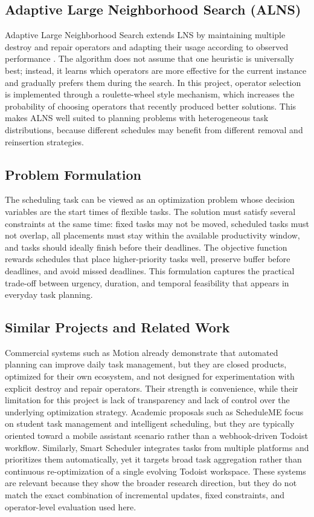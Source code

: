 \documentclass{article}
\begin{document}
\subsection{Adaptive Large Neighborhood Search (ALNS)}
Adaptive Large Neighborhood Search extends LNS by maintaining multiple destroy and repair operators and adapting their usage according to observed performance \cite{ropke2006}. The algorithm does not assume that one heuristic is universally best; instead, it learns which operators are more effective for the current instance and gradually prefers them during the search. In this project, operator selection is implemented through a roulette-wheel style mechanism, which increases the probability of choosing operators that recently produced better solutions. This makes ALNS well suited to planning problems with heterogeneous task distributions, because different schedules may benefit from different removal and reinsertion strategies.

\subsection{Problem Formulation}
The scheduling task can be viewed as an optimization problem whose decision variables are the start times of flexible tasks. The solution must satisfy several constraints at the same time: fixed tasks may not be moved, scheduled tasks must not overlap, all placements must stay within the available productivity window, and tasks should ideally finish before their deadlines. The objective function rewards schedules that place higher-priority tasks well, preserve buffer before deadlines, and avoid missed deadlines. This formulation captures the practical trade-off between urgency, duration, and temporal feasibility that appears in everyday task planning.

\subsection{Similar Projects and Related Work}
Commercial systems such as Motion \cite{motion} already demonstrate that automated planning can improve daily task management, but they are closed products, optimized for their own ecosystem, and not designed for experimentation with explicit destroy and repair operators. Their strength is convenience, while their limitation for this project is lack of transparency and lack of control over the underlying optimization strategy. Academic proposals such as ScheduleME \cite{scheduleme} focus on student task management and intelligent scheduling, but they are typically oriented toward a mobile assistant scenario rather than a webhook-driven Todoist workflow. Similarly, Smart Scheduler \cite{smartscheduler} integrates tasks from multiple platforms and prioritizes them automatically, yet it targets broad task aggregation rather than continuous re-optimization of a single evolving Todoist workspace. These systems are relevant because they show the broader research direction, but they do not match the exact combination of incremental updates, fixed constraints, and operator-level evaluation used here.
\end{document}
